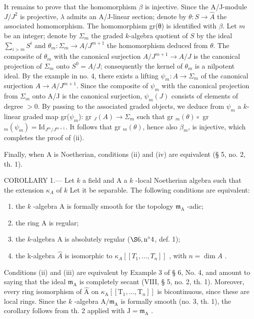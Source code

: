 It remains to prove that the homomorphism \(\beta\) is injective. Since the A/J-module \(J/J^{2}\) is projective, \(\lambda\) admits an A/J-linear section; denote by \(\theta: S \to \widehat{A}\) the associated homomorphism. The homomorphism gr(θ) is identified with \(\beta\). Let \(m\) be an integer; denote by \(\Sigma_{m}\) the graded \(k\)-algebra quotient of \(S\) by the ideal \(\sum_{i > m} S^{i}\) and \(\theta_{m}: \Sigma_{m} \to A/J^{m+1}\) the homomorphism deduced from \(\theta\). The composite of \(\theta_{m}\) with the canonical surjection \(A/J^{m+1} \longrightarrow A/J\) is the canonical projection of \(\Sigma_{m}\) onto \(S^{0} = A/J\); consequently the kernel of \(\theta_{m}\) is a nilpotent ideal. By the example in no. 4, there exists a lifting \(\psi_{m}: A \to \Sigma_{m}\) of the canonical surjection \(A \to A/J^{m+1}\). Since the composite of \(\psi_{m}\) with the canonical projection from \(\Sigma_{m}\) onto A/J is the canonical surjection, \(\psi_{m}(J)\) consists of elements of degree \(>0\). By passing to the associated graded objects, we deduce from \(\psi_{m}\) a \(k\)-linear graded map gr(\(\psi_{m}\)): gr \(_{J}(A) \to \Sigma_{m}\) such that gr \(_{m}(\theta) \circ\) gr \(_{m}(\psi_{m}) = \text{Id}_{J^{m}/J^{m+1}}\). It follows that gr \(_{m}(\theta)\), hence also \(\beta_{m}\), is injective, which completes the proof of (ii).

Finally, when A is Noetherian, conditions (ii) and (iv) are equivalent (§ 5, no. 2, th. 1).

COROLLARY 1.--- Let \(k\) a field and A a \(k\) -local Noetherian algebra such that the extension \(\kappa_{A}\) of \(k\) Let it be separable. The following conditions are equivalent:

\begin{enumerate}
\def\labelenumi{(\roman{enumi})}
\item
  the \(k\) -algebra A is formally smooth for the topology \(\mathfrak{m}_{\mathrm{A}}\) -adic;
\item
  the ring A is regular;
\item
  the \(k\)-algebra A is absolutely regular (\(\S 6, \mathrm{n}^{\circ} 4\), def. 1);
\item
  the k-algebra \(\hat{A}\) is isomorphic to \(\kappa_{A}[[T_{1},\ldots,T_{n}]]\) , with \(n=\dim A\) .
\end{enumerate}

Conditions (ii) and (iii) are equivalent by Example 3 of § 6, No. 4, and amount to saying that the ideal \(\mathfrak{m}_{\mathrm{A}}\) is completely secant (VIII, § 5, no. 2, th. 1). Moreover, every ring isomorphism of \(\widehat{\mathrm{A}}\) on \(\kappa_{\mathrm{A}}[[\mathrm{T}_{1},\ldots,\mathrm{T}_{n}]]\) is bicontinuous, since these are local rings. Since the \(k\) -algebra \(\mathrm{A}/\mathfrak{m}_{\mathrm{A}}\) is formally smooth (no. 3, th. 1), the corollary follows from th. 2 applied with \(\mathrm{J}=\mathfrak{m}_{\mathrm{A}}\) .

